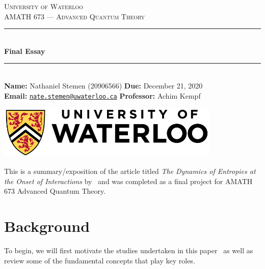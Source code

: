 \documentclass[11pt]{article}
\theoremstyle{definition}
\begin{document}
\begin{titlepage}
	\newcommand{\HRule}{\rule{\linewidth}{0.5mm}}

	\begin{center}

		\textsc{\LARGE University of Waterloo}\\[1.5cm]

		\textsc{\large AMATH 673 --- Advanced Quantum Theory}\\[0.75cm]

		\HRule\\[0.4cm]

		{\huge\bfseries Final Essay}\\[0.15cm]

		\HRule\\[1cm]

		{\large
		\textbf{Name:} Nathaniel Stemen (20906566)\hspace{\fill} \textbf{Due:} December 21, 2020 \\
		\textbf{Email:} \href{mailto:nate.stemen@uwaterloo.ca}{\texttt{nate.stemen@uwaterloo.ca}} \hspace{\fill} \textbf{Professor:} Achim Kempf
		}

		\vfill
		\includegraphics[width=0.8\textwidth]{uwlogo.jpg}\\[1cm]
	\end{center}
\end{titlepage}

\begingroup
{}
\hypersetup{linkcolor=darkblue}
\tableofcontents
\endgroup

\setlength{\parskip}{0.4em}
\renewcommand{\baselinestretch}{1.2}

\vspace{1cm}
\noindent
This is a summary/exposition of the article titled \emph{The Dynamics of Entropies at the Onset of Interactions} by~\citeauthor{dynamic-entropies} and was completed as a final project for AMATH 673 Advanced Quantum Theory.

\section{Background}
To begin, we will first motivate the studies undertaken in this paper~\cite{dynamic-entropies} as well as review some of the fundamental concepts that play key roles.
\end{document}
